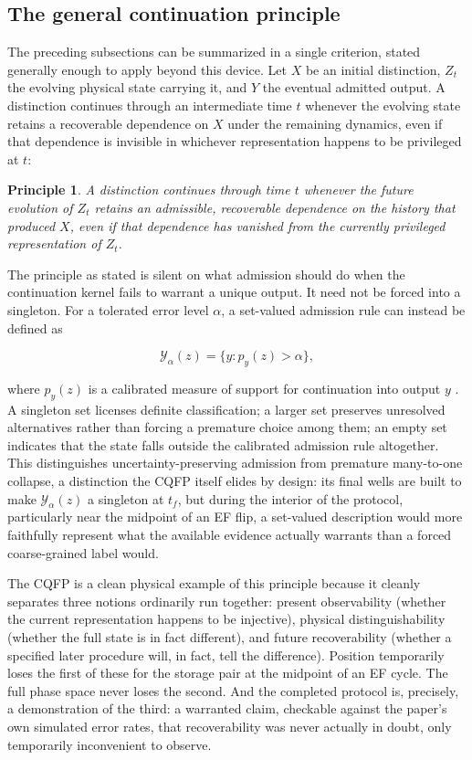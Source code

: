 \documentclass[11pt]{article}
\newtheorem{principle}{Principle}
\begin{document}
\subsection{The general continuation principle}

The preceding subsections can be summarized in a single criterion, stated generally enough to apply beyond this device. Let $X$ be an initial distinction, $Z_t$ the evolving physical state carrying it, and $Y$ the eventual admitted output. A distinction continues through an intermediate time $t$ whenever the evolving state retains a recoverable dependence on $X$ under the remaining dynamics, even if that dependence is invisible in whichever representation happens to be privileged at $t$:

\begin{principle}
A distinction continues through time $t$ whenever the future evolution of $Z_t$ retains an admissible, recoverable dependence on the history that produced $X$, even if that dependence has vanished from the currently privileged representation of $Z_t$.
\end{principle}

The principle as stated is silent on what admission should do when the continuation kernel fails to warrant a unique output. It need not be forced into a singleton. For a tolerated error level $\alpha$, a set-valued admission rule can instead be defined as

\[
\mathcal Y_\alpha(z) = \bigl\{y : p_y(z)>\alpha\bigr\},
\]

where $p_y(z)$ is a calibrated measure of support for continuation into output $y$ \cite{FuEtAl2026}. A singleton set licenses definite classification; a larger set preserves unresolved alternatives rather than forcing a premature choice among them; an empty set indicates that the state falls outside the calibrated admission rule altogether. This distinguishes uncertainty-preserving admission from premature many-to-one collapse, a distinction the CQFP itself elides by design: its final wells are built to make $\mathcal Y_\alpha(z)$ a singleton at $t_f$, but during the interior of the protocol, particularly near the midpoint of an EF flip, a set-valued description would more faithfully represent what the available evidence actually warrants than a forced coarse-grained label would.

The CQFP is a clean physical example of this principle because it cleanly separates three notions ordinarily run together: present observability (whether the current representation happens to be injective), physical distinguishability (whether the full state is in fact different), and future recoverability (whether a specified later procedure will, in fact, tell the difference). Position temporarily loses the first of these for the storage pair at the midpoint of an EF cycle. The full phase space never loses the second. And the completed protocol is, precisely, a demonstration of the third: a warranted claim, checkable against the paper's own simulated error rates, that recoverability was never actually in doubt, only temporarily inconvenient to observe.
\end{document}

